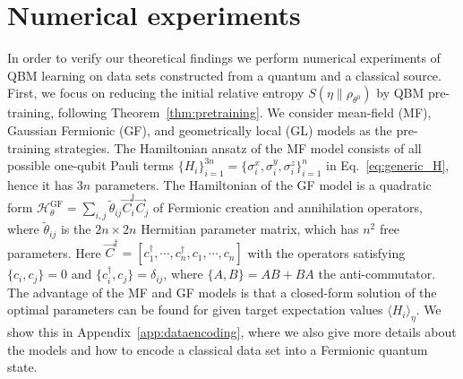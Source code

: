 \documentclass[
    aps,
    prx,
    floatfix,
    nofootinbib,
    onecolumn
]{revtex4-2}
\begin{document}
\section*{Numerical experiments}

In order to verify our theoretical findings we perform numerical experiments of QBM learning on data sets constructed from a quantum and a classical source. First, we focus on reducing the initial relative entropy $S(\eta \|\rho_{\theta^0})$ by QBM pre-training, following Theorem~\ref{thm:pretraining}.  We consider mean-field (MF), Gaussian Fermionic (GF), and geometrically local (GL) models as the pre-training strategies. The Hamiltonian ansatz of the MF model consists of all possible one-qubit Pauli terms $\{H_i\}_{i=1}^{3n}=\{ \sigma_i^x, \sigma_i^y, \sigma_i^z\}_{i=1}^{n}$ in Eq.~\eqref{eq:generic_H}, hence it has $3n$ parameters. The Hamiltonian of the GF model is a quadratic form $\mathcal{H}_\theta^{\mathrm{GF}}= \sum_{i,j}\tilde{\theta}_{ij}\vec{
C}_i^\dagger \vec{C}_j$ of Fermionic creation and annihilation operators, where $\tilde{\theta}_{ij}$ is the $2n\times 2n$ Hermitian parameter matrix, which has $n^2$ free parameters. Here $\vec{C}^\dagger = [c_1^\dagger, \cdots, c_n^\dagger, c_1, \cdots, c_n]$ with the operators satisfying $\{c_i, c_j\} = 0$ and $\{c_i^\dagger, c_j\}=\delta_{ij}$, where $\{A, B\} = AB + BA$ the anti-commutator.  The advantage of the MF and GF models is that a closed-form solution of the optimal parameters can be found for given target expectation values $\langle H_i \rangle_\eta$. We show this in Appendix~\ref{app:dataencoding}, where we also give more details about the models and how to encode a classical data set into a Fermionic quantum state.
\end{document}
